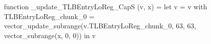function _update_TLBEntryLoReg_CapS (v, x) = let v = { v with TLBEntryLoReg_chunk_0 = vector_update_subrange(v.TLBEntryLoReg_chunk_0, 63, 63, vector_subrange(x, 0, 0)) } in v
